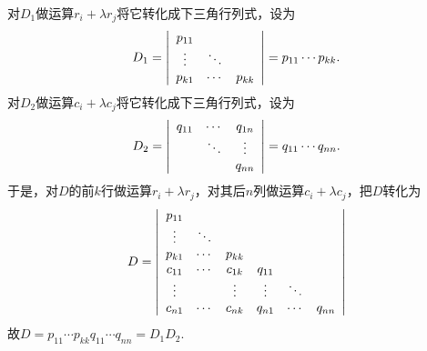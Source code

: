 \begin{frame}
  \begin{footnotesize}
    \proofname
    对$D_1$做运算$r_i+\lambda r_j$将它转化成下三角行列式，设为
    $$
    D_1 =  \left|
    \begin{array}{ccc}
      p_{11} &       & \\
      \vdots    & \ddots  &  \\
      p_{k1} & \cdots   & p_{kk} 
    \end{array}
    \right| = p_{11} \cdots p_{kk}.
    $$\pause 
    对$D_2$做运算$c_i+\lambda c_j$将它转化成下三角行列式，设为
    $$
    D_2 =  \left|
    \begin{array}{ccc}
      q_{11} & \cdots  &  q_{1n}\\
      & \ddots  &  \vdots \\
             &      & q_{nn} \\
    \end{array}
    \right| = q_{11}\cdots q_{nn}.
    $$ \pause 
    于是，对$D$的前$k$行做运算$r_i+\lambda r_j$，对其后$n$列做运算$c_i+\lambda c_j$，把$D$转化为
    $$
    D = \left|
    \begin{array}{cccccc}
      p_{11} &      &  &    &    &   \\
      \vdots    & \ddots    &   &    &    &   \\
      p_{k1} & \cdots & p_{kk} &    &    &   \\
      c_{11} & \cdots & c_{1k} & q_{11}&  &    \\
      \vdots    &     & \vdots   & \vdots  &  \ddots  &  \\
      c_{n1} & \cdots & c_{nk} & q_{n1}&  \cdots & q_{nn}
    \end{array}
    \right|
    $$ \pause 
    故$D = p_{11}\cdots p_{kk} q_{11}\cdots q_{nn} = D_1 D_2$.
  \end{footnotesize}
\end{frame}




